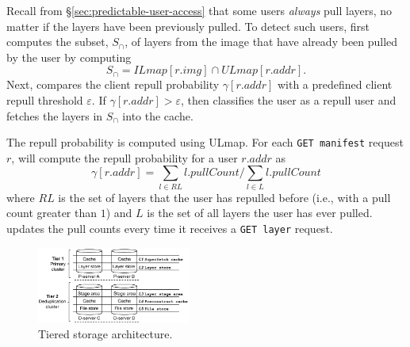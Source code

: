 Recall from \S\ref{sec:predictable-user-access} that some users \emph{always} pull
layers, no matter if the layers have been previously pulled. To detect such users,
\sysname first computes the subset, $S_{\cap}$, of layers from the image that have already
been pulled by the user by computing
%
\begin{equation*}
S_{\cap} = ILmap[r.img] \cap ULmap[r.addr].
\end{equation*}
%
Next,  \sysname compares the client repull probability 
$\gamma[r.addr]$ with a predefined client repull threshold $\varepsilon$.
If $\gamma[r.addr] > \varepsilon$, then \sysname classifies the user as a repull user
and fetches the layers in $S_{\cap}$ into the cache.
%

The repull probability is computed using ULmap. For each
\texttt{GET manifest} request $r$, \sysname will compute the repull probability for a user
$r.addr$ as
\begin{equation*}
\gamma[r.addr] = \sum_{l \in RL} l.pullCount /  \sum_{l \in L} l.pullCount
\end{equation*}
where $RL$ is the set of layers that the user has repulled before (i.e.,
 with a pull count greater
than $1$) and $L$ is the set of all layers the user has ever pulled.
\sysname updates the pull
counts every time it receives a \texttt{GET layer} request.
%

\begin{figure}[t]
	\centering
	\centering
	\includegraphics[width=0.45\textwidth]{graphs/sift-cache-bigger.pdf}
	\caption{Tiered storage architecture.}
	\label{fig:tieredstore}
\end{figure} 

